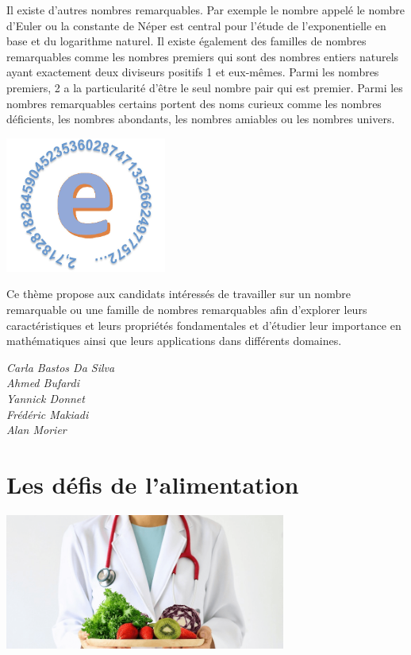 \documentclass[
  10pt,
  french,
  a5paper,
  openany]{book}
\newenvironment{signature}{\begin{flushright}}{\end{flushright}}
\begin{document}
Il existe d'autres nombres remarquables. Par exemple le nombre appelé le nombre d'Euler ou la constante de Néper est central pour l'étude de l'exponentielle en base et du logarithme naturel. Il existe également des familles de nombres remarquables comme les nombres premiers qui sont des nombres entiers naturels ayant exactement deux diviseurs positifs 1 et eux-mêmes. Parmi les nombres premiers, 2 a la particularité d'être le seul nombre pair qui est premier. Parmi les nombres remarquables certains portent des noms curieux comme les nombres déficients, les nombres abondants, les nombres amiables ou les nombres univers.

\begin{center}
\includegraphics[width=\textwidth,height=12em]{images/les-nombres-remarquables-2.jpg}

\end{center}

Ce thème propose aux candidats intéressés de travailler sur un nombre remarquable ou une famille de nombres remarquables afin d'explorer leurs caractéristiques et leurs propriétés fondamentales et d'étudier leur importance en mathématiques ainsi que leurs applications dans différents domaines.

\begin{signature}
\emph{Carla Bastos Da Silva}\\
\emph{Ahmed Bufardi}\\
\emph{Yannick Donnet}\\
\emph{Frédéric Makiadi}\\
\emph{Alan Morier}

\end{signature}

\hypertarget{les-duxe9fis-de-lalimentation}{%
\chapter{Les défis de l'alimentation}\label{les-duxe9fis-de-lalimentation}}

\begin{center}
\includegraphics[width=\textwidth,height=12em]{images/les-defis-de-lalimentation.png}

\end{center}
\end{document}
